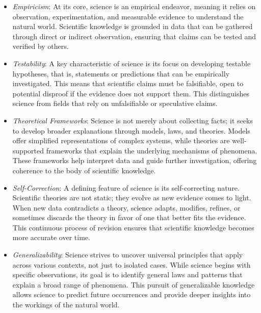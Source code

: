 \begin{itemize}

\item \emph{Empiricism}: At its core, science is an empirical endeavor, meaning it relies on observation, experimentation, and measurable evidence to understand the natural world. Scientific knowledge is grounded in data that can be gathered through direct or indirect observation, ensuring that claims can be tested and verified by others.

\item \emph{Testability}: A key characteristic of science is its focus on developing testable hypotheses, that is, statements or predictions that can be empirically investigated. This means that scientific claims must be falsifiable, open to potential disproof if the evidence does not support them. This distinguishes science from fields that rely on unfalsifiable or speculative claims.

\item \emph{Theoretical Frameworks}: Science is not merely about collecting facts; it seeks to develop broader explanations through models, laws, and theories. Models offer simplified representations of complex systems, while theories are well-supported frameworks that explain the underlying mechanisms of phenomena. These frameworks help interpret data and guide further investigation, offering coherence to the body of scientific knowledge.

\item \emph{Self-Correction}: A defining feature of science is its self-correcting nature. Scientific theories are not static; they evolve as new evidence comes to light. When new data contradicts a theory, science adapts, modifies, refines, or sometimes discards the theory in favor of one that better fits the evidence. This continuous process of revision ensures that scientific knowledge becomes more accurate over time.

\item \emph{Generalizability}: Science strives to uncover universal principles that apply across various contexts, not just to isolated cases. While science begins with specific observations, its goal is to identify general laws and patterns that explain a broad range of phenomena. This pursuit of generalizable knowledge allows science to predict future occurrences and provide deeper insights into the workings of the natural world.

\end{itemize}

